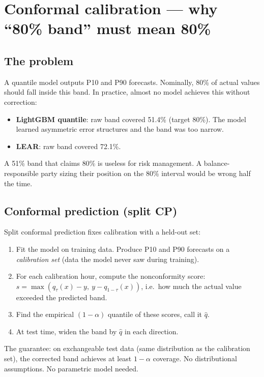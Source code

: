 \section{Conformal calibration --- why ``80\% band'' must mean 80\%}

\subsection{The problem}

A quantile model outputs P10 and P90 forecasts. Nominally, 80\% of
actual values should fall inside this band. In practice, almost no model
achieves this without correction:

\begin{itemize}
  \item \textbf{LightGBM quantile}: raw band covered 51.4\% (target 80\%).
        The model learned asymmetric error structures and the band was too narrow.
  \item \textbf{LEAR}: raw band covered 72.1\%.
\end{itemize}

A 51\% band that claims 80\% is useless for risk management. A balance-
responsible party sizing their position on the 80\% interval would be
wrong half the time.

\subsection{Conformal prediction (split CP)}

Split conformal prediction fixes calibration with a held-out set:

\begin{enumerate}
  \item Fit the model on training data. Produce P10 and P90 forecasts on
        a \emph{calibration set} (data the model never saw during training).
  \item For each calibration hour, compute the nonconformity score:
        $s = \max(q_\tau(x) - y,\ y - q_{1-\tau}(x))$, i.e.\ how much
        the actual value exceeded the predicted band.
  \item Find the empirical $(1 - \alpha)$ quantile of these scores, call
        it $\hat{q}$.
  \item At test time, widen the band by $\hat{q}$ in each direction.
\end{enumerate}

The guarantee: on exchangeable test data (same distribution as the
calibration set), the corrected band achieves at least $1 - \alpha$
coverage. No distributional assumptions. No parametric model needed.

